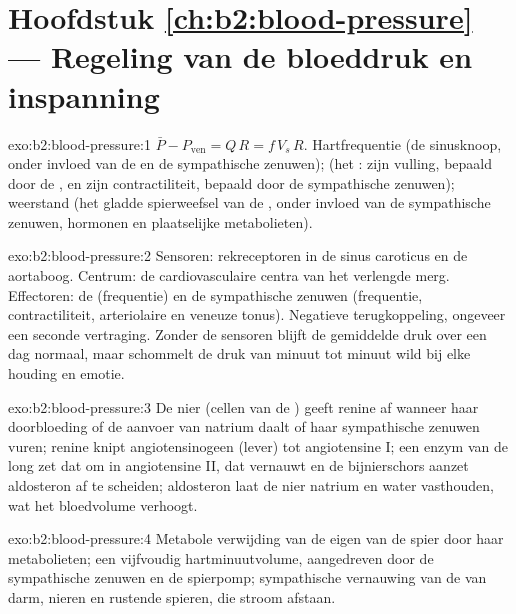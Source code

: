 \section*{Hoofdstuk \ref{ch:b2:blood-pressure} --- Regeling van de bloeddruk en inspanning}

\begin{solution}{exo:b2:blood-pressure:1}
$\bar P - P_{\text{ven}} = Q\,R = f\,V_s\,R$. Hartfrequentie (de sinusknoop,
onder invloed van de  en de sympathische zenuwen); 
(het : zijn vulling, bepaald door de , en zijn contractiliteit,
bepaald door de sympathische zenuwen); weerstand (het gladde spierweefsel
van de , onder invloed van de sympathische zenuwen, hormonen en
plaatselijke metabolieten).
\end{solution}

\begin{solution}{exo:b2:blood-pressure:2}
Sensoren: rekreceptoren in de sinus caroticus en de aortaboog. Centrum: de
cardiovasculaire centra van het verlengde merg. Effectoren: de 
(frequentie) en de sympathische zenuwen (frequentie, contractiliteit,
arteriolaire en veneuze tonus). Negatieve terugkoppeling, ongeveer een
seconde vertraging. Zonder de sensoren blijft de gemiddelde druk over een
dag normaal, maar schommelt de druk van minuut tot minuut wild bij elke
houding en emotie.
\end{solution}

\begin{solution}{exo:b2:blood-pressure:3}
De nier (cellen van de ) geeft renine af wanneer haar doorbloeding
of de aanvoer van natrium daalt of haar sympathische zenuwen vuren; renine
knipt angiotensinogeen (lever) tot angiotensine I; een enzym van de long zet
dat om in angiotensine II, dat  vernauwt en de bijnierschors
aanzet aldosteron af te scheiden; aldosteron laat de nier natrium en water
vasthouden, wat het bloedvolume verhoogt.
\end{solution}

\begin{solution}{exo:b2:blood-pressure:4}
Metabole verwijding van de eigen  van de spier door haar
metabolieten; een vijfvoudig hartminuutvolume, aangedreven door de
sympathische zenuwen en de spierpomp; sympathische vernauwing van de
 van darm, nieren en rustende spieren, die stroom afstaan.
\end{solution}

